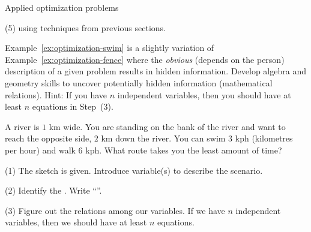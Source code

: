 \documentclass[../main.tex]{subfiles}
\begin{document}
\begin{lesson}{Applied optimization problems}
\begin{example}

    (5)  using techniques from previous sections.

    \clearpage
  \end{example}

  Example~\ref{ex:optimization-swim} is a slightly variation of Example~\ref{ex:optimization-fence} where the \emph{obvious} (depends on the person) description of a given problem results in hidden information. Develop algebra and geometry skills to uncover potentially hidden information (mathematical relations). Hint: If you have \(n\) independent variables, then you should have at least \(n\) equations in Step~(3).

  \begin{example} \label{ex:optimization-swim}
    A  river is \(1\) km wide. You are standing on the bank of the river and want to reach the opposite side, \(2\) km down the river. You can swim \(3\) kph (kilometres per hour) and walk \(6\) kph. What route takes you the least amount of time?

    \hfill{}

    (1) The sketch is given. Introduce variable(s) to describe the scenario.

    (2) Identify the . Write ``''. 

    (3) Figure out the relations among our variables. If we have \(n\) independent variables, then we should have at least \(n\) equations.


\end{example}
\end{lesson}
\end{document}
